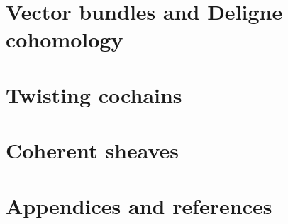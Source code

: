 \documentclass[11pt,twoside]{article}
\numberwithin{equation}{subsection}
\numberwithin{theorem}{subsection}
\numberwithin{lemma}{subsection}
\numberwithin{corollary}{subsection}
\numberwithin{definition}{subsection}
\numberwithin{example}{subsection}
\numberwithin{note}{subsection}
\begin{document}
    \newpage
    \part{Vector bundles and Deligne cohomology} %
    \label{prt:vector_bundles_deligne}
    
        




    \newpage
    \part{Twisting cochains} %
    \label{prt:twisting_cochains}
    
        




    \newpage
    \part{Coherent sheaves} %
    \label{prt:coherent_sheaves}

        
    



    \newpage
    \part{Appendices and references} %
    \label{prt:appendices_and_references}
    
        \begin{appendices}

            

        \end{appendices}

        \newpage
        \printbibliography

\end{document}
